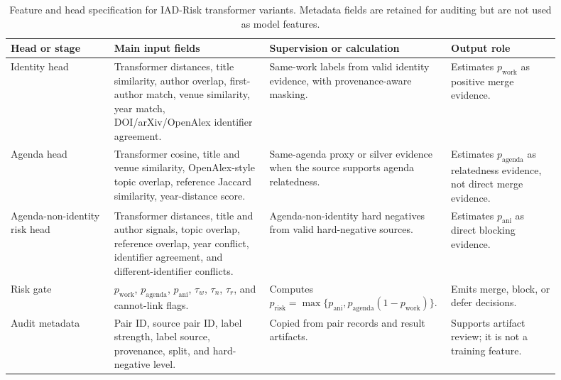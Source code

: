 \documentclass[11pt]{article}
\begin{document}
\begin{table}[H]
\caption{Feature and head specification for IAD-Risk transformer variants. Metadata fields are retained for auditing but are not used as model features.}
\label{tab:feature-head-specification}
\centering
\footnotesize
\setlength{\tabcolsep}{3pt}
\begin{tabular}{L{0.18\linewidth}L{0.27\linewidth}L{0.26\linewidth}L{0.19\linewidth}}
\toprule
Head or stage & Main input fields & Supervision or calculation & Output role \\
\midrule
Identity head & Transformer distances, title similarity, author overlap, first-author match, venue similarity, year match, DOI/arXiv/OpenAlex identifier agreement. & Same-work labels from valid identity evidence, with provenance-aware masking. & Estimates $p_{\mathrm{work}}$ as positive merge evidence. \\
Agenda head & Transformer cosine, title and venue similarity, OpenAlex-style topic overlap, reference Jaccard similarity, year-distance score. & Same-agenda proxy or silver evidence when the source supports agenda relatedness. & Estimates $p_{\mathrm{agenda}}$ as relatedness evidence, not direct merge evidence. \\
Agenda-non-identity risk head & Transformer distances, title and author signals, topic overlap, reference overlap, year conflict, identifier agreement, and different-identifier conflicts. & Agenda-non-identity hard negatives from valid hard-negative sources. & Estimates $p_{\mathrm{ani}}$ as direct blocking evidence. \\
Risk gate & $p_{\mathrm{work}}$, $p_{\mathrm{agenda}}$, $p_{\mathrm{ani}}$, $\tau_w$, $\tau_n$, $\tau_r$, and cannot-link flags. & Computes $p_{\mathrm{risk}}=\max\{p_{\mathrm{ani}},p_{\mathrm{agenda}}(1-p_{\mathrm{work}})\}$. & Emits merge, block, or defer decisions. \\
Audit metadata & Pair ID, source pair ID, label strength, label source, provenance, split, and hard-negative level. & Copied from pair records and result artifacts. & Supports artifact review; it is not a training feature. \\
\bottomrule
\end{tabular}
\end{table}
\end{document}
